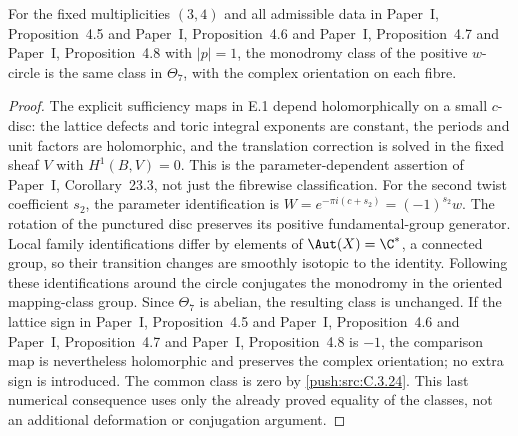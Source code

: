 \begin{proposition}\label{push:src:C.4.1}
For the fixed multiplicities $(3,4)$ and all admissible data in Paper~I, Proposition~4.5 and Paper~I, Proposition~4.6 and Paper~I, Proposition~4.7 and Paper~I, Proposition~4.8
with $|p|=1$, the monodromy class of the positive $w$-circle is the
same class in $\Theta_7$, with the complex orientation on each fibre.
\end{proposition}


\begin{proof}
The explicit sufficiency maps in E.1 depend holomorphically on a
small $c$-disc: the lattice defects and toric integral exponents are
constant, the periods and unit factors are holomorphic, and the
translation correction is solved in the fixed sheaf $V$ with
$H^1(B,V)=0$. This is the parameter-dependent assertion of Paper~I, Corollary~23.3,
not just the fibrewise classification. For the second twist
coefficient $s_2$, the parameter identification is
$W=e^{-\pi i(c+s_2)}=(-1)^{s_2}w$.
The rotation of the punctured disc preserves its positive
fundamental-group generator. Local family identifications differ
by elements of $\Aut(X)=\C^*$, a connected group, so their
transition changes are smoothly isotopic to the identity. Following
these identifications around the circle conjugates the monodromy
in the oriented mapping-class group. Since $\Theta_7$ is abelian,
the resulting class is unchanged. If the lattice sign in Paper~I, Proposition~4.5 and Paper~I, Proposition~4.6 and Paper~I, Proposition~4.7 and Paper~I, Proposition~4.8 is
$-1$, the comparison map is nevertheless holomorphic and preserves
the complex orientation; no extra sign is introduced.
The common class is zero by \ref{push:src:C.3.24}. This last numerical consequence
uses only the already proved equality of the classes, not an
additional deformation or conjugation argument.
\end{proof}

